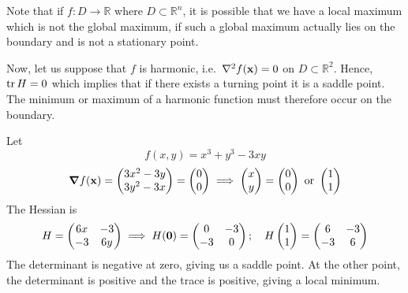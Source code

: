 Note that if \(f \colon D \to \mathbb R\) where \(D \subset \mathbb R^n\), it is possible that we have a local maximum which is not the global maximum, if such a global maximum actually lies on the boundary and is not a stationary point.

Now, let us suppose that \(f\) is harmonic, i.e.\ \(\laplacian{f(\vb x)} = 0\) on \(D \subset \mathbb R^2\).
Hence, \(\tr H = 0\) which implies that if there exists a turning point it is a saddle point.
The minimum or maximum of a harmonic function must therefore occur on the boundary.

\begin{example}
	Let
	\[
		f(x, y) = x^3 + y^3 - 3xy
	\]
	\[
		\grad{f(\vb x)} = \begin{pmatrix}
			3x^2 - 3y \\ 3y^2 - 3x
		\end{pmatrix} = \begin{pmatrix}
			0 \\ 0
		\end{pmatrix} \implies \begin{pmatrix}
			x \\ y
		\end{pmatrix} = \begin{pmatrix}
			0 \\ 0
		\end{pmatrix} \text{ or } \begin{pmatrix}
			1 \\ 1
		\end{pmatrix}
	\]
	The Hessian is
	\[
		H = \begin{pmatrix}
			6x & -3 \\ -3 & 6y
		\end{pmatrix} \implies H(\vb 0) = \begin{pmatrix}
			0 & -3 \\ -3 & 0
		\end{pmatrix};\quad H\begin{pmatrix}
			1 \\ 1
		\end{pmatrix} = \begin{pmatrix}
			6 & -3 \\ -3 & 6
		\end{pmatrix}
	\]
	The determinant is negative at zero, giving us a saddle point.
	At the other point, the determinant is positive and the trace is positive, giving a local minimum.
\end{example}

